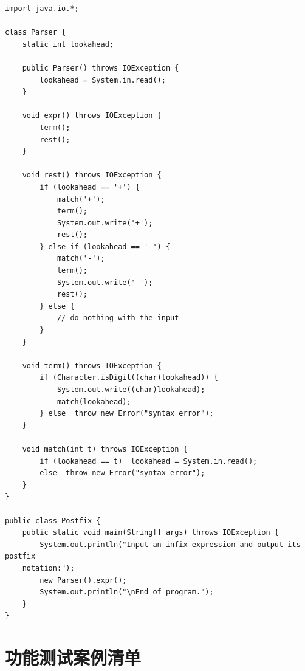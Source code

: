 \documentclass[a4paper, twoside, utf8]{ctexart}
\begin{document}
    \begin{verbatim}
import java.io.*;

class Parser {
    static int lookahead;

    public Parser() throws IOException {
        lookahead = System.in.read();
    }

    void expr() throws IOException {
        term();
        rest();
    }

    void rest() throws IOException {
        if (lookahead == '+') {
            match('+');
            term();
            System.out.write('+');
            rest();
        } else if (lookahead == '-') {
            match('-');
            term();
            System.out.write('-');
            rest();
        } else {
            // do nothing with the input
        }
    }

    void term() throws IOException {
        if (Character.isDigit((char)lookahead)) {
            System.out.write((char)lookahead);
            match(lookahead);
        } else  throw new Error("syntax error");
    }

    void match(int t) throws IOException {
        if (lookahead == t)  lookahead = System.in.read();
        else  throw new Error("syntax error");
    }
}

public class Postfix {
    public static void main(String[] args) throws IOException {
        System.out.println("Input an infix expression and output its postfix
    notation:");
        new Parser().expr();
        System.out.println("\nEnd of program.");
    }
}
    \end{verbatim}

    \section{功能测试案例清单}
\end{document}
